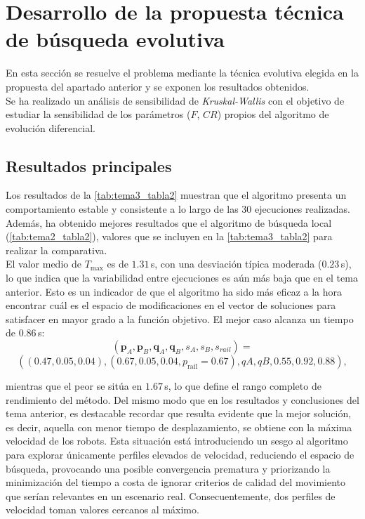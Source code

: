 \newpage
{}
\section*{Desarrollo de la propuesta técnica de búsqueda evolutiva}
En esta sección se resuelve el problema mediante la técnica evolutiva elegida 
en la propuesta del apartado anterior y se exponen los resultados obtenidos.\\

Se ha realizado un análisis de sensibilidad de \textit{Kruskal-Wallis} con el 
objetivo de estudiar la sensibilidad de los parámetros ($F$, $CR$) propios del 
algoritmo de evolución diferencial.

\subsection*{Resultados principales}
Los resultados de la \autoref{tab:tema3_tabla2} muestran que el algoritmo presenta un comportamiento
estable y consistente a lo largo de las 30 ejecuciones realizadas. Además, ha obtenido mejores 
resultados que el algoritmo de búsqueda local (\autoref{tab:tema2_tabla2}), valores que se incluyen 
en la \autoref{tab:tema3_tabla2} para realizar la comparativa. \\

El valor medio de $T_{\max}$ es
de $1.31$\,s, con una desviación típica moderada ($0.23$\,s), lo que indica que la variabilidad entre
ejecuciones es aún más baja que en el tema anterior. Esto es un indicador de que el algoritmo ha
sido más eficaz a la hora encontrar cuál es el espacio de modificaciones en el vector de soluciones para 
satisfacer en mayor grado a la función objetivo. El mejor caso alcanza un tiempo de 0.86\,s: 
\[(\mathbf{p}_A,\mathbf{p}_B,
\mathbf{q}_A,\mathbf{q}_B,
s_A,s_B,s_{rail}) = \]
\[((0.47, 0.05, 0.04), (0.67, 0.05, 0.04, p_{\text{raíl}} = 0.67), qA, qB, 0.55, 0.92, 0.88),\]

mientras que el peor se sitúa en $1.67$\,s, lo que define el rango completo de rendimiento del método. Del mismo
modo que en los resultados y conclusiones del tema anterior, es
destacable recordar que resulta evidente que la mejor solución, es decir, aquella con menor tiempo
de desplazamiento, se obtiene con la máxima velocidad de los robots. Esta situación está 
introduciendo un sesgo al algoritmo para explorar únicamente perfiles elevados de velocidad, 
reduciendo el espacio de búsqueda, provocando una posible convergencia prematura y priorizando la 
minimización del tiempo a costa de ignorar criterios de calidad del movimiento que serían relevantes en un escenario real. 
Consecuentemente, dos perfiles de velocidad toman valores cercanos al máximo. \\

